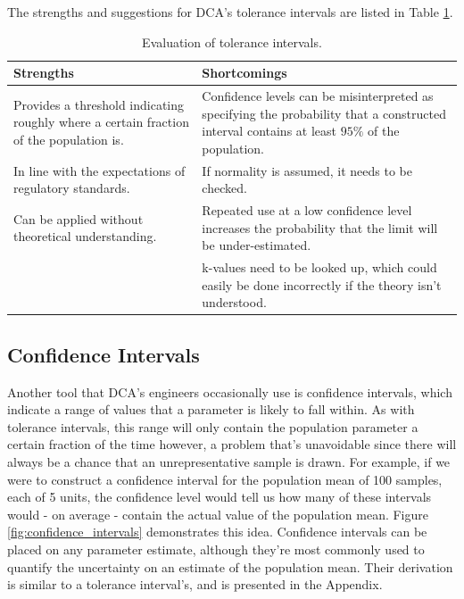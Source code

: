 \documentclass[11pt,a4paper,article]{memoir} %
\begin{document}
The strengths and suggestions for DCA's tolerance intervals are listed in Table \ref{tab:tol_intervals}.
\begin{table}
\caption{Evaluation of tolerance intervals.}
\small
\hspace*{-.5cm}
\begin{tabular}{p{6.5cm}p{6.5cm}}
\toprule
\textbf{Strengths}	&	\textbf{Shortcomings} \\
\toprule
Provides a threshold indicating roughly where a certain fraction of the population is. & Confidence levels can be misinterpreted as specifying the probability that a constructed interval contains at least $95\%$ of the population. \\
In line with the expectations of regulatory standards. & If normality is assumed, it needs to be checked. \\
Can be applied without theoretical understanding. & Repeated use at a low confidence level increases the probability that the limit will be under-estimated. \\
& k-values need to be looked up, which could easily be done incorrectly if the theory isn't understood.\\
\bottomrule
\end{tabular}
\label{tab:tol_intervals}
\end{table}

\newpage
\subsection*{Confidence Intervals}
Another tool that DCA's engineers occasionally use is confidence intervals, which indicate a range of values that a parameter is likely to fall within. As with tolerance intervals, this range will only contain the population parameter a certain fraction of the time however, a problem that's unavoidable since there will always be a chance that an unrepresentative sample is drawn. For example, if we were to construct a confidence interval for the population mean of 100 samples, each of 5 units, the confidence level would tell us how many of these intervals would - on average - contain the actual value of the population mean. Figure \ref{fig:confidence_intervals} demonstrates this idea. Confidence intervals can be placed on any parameter estimate, although they're most commonly used to quantify the uncertainty on an estimate of the population mean. Their derivation is similar to a tolerance interval's, and is presented in the Appendix.
\end{document}
